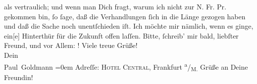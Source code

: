 \begin{ledgroupsized}[t]{13cm}
               als vertraulich; und wenn man  Dich fragt, warum ich
               nicht zur N. Fr. Pr. gekommen bin, ſo  ſage, daß die Verhandlungen
               ſich in die Länge gezogen haben und daß die Sache noch unentſchieden iſt. Ich möchte
               mir nämlich, wenn es ginge, ein{[}e{]} Hinterthür für die Zukunft
               offen laſſen.\pend
           \pstart
           Bitte, ſchreib’ mir bald, liebſter Freund, und vor Allem: \label{K_L02868-10v}\label{K_L02868-10h}!\pend
           \pstart
           Viele treue Grüße! {\\[\baselineskip]}Dein {\\[\baselineskip]}\spacefill\mbox{Paul Goldmann}\pend
           \leftskip=0em{}\pstart
           \noindent{}Adreſſe: \textsc{Hotel Central}, Frankfurt \textsuperscript{a}/\textsubscript{M.}\pend
           \pstart
           Grüße an Deine Freundin!\pend
           
         
         \endnumbering{}\end{ledgroupsized}  \newcommand{\dateiname}{L02868}\newcommand{\titel}{Paul Goldmann an Arthur Schnitzler, 5. 3. [1899]}\newcommand{\editorInnen}{Martin Anton Müller und Laura Untner}
      